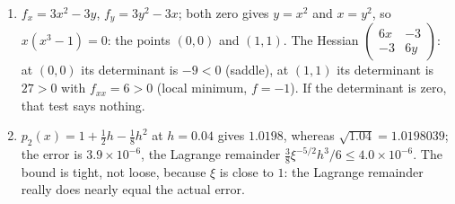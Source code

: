 \begin{enumerate}[label=\textbf{12.\arabic*}]
  \item $f_{x}=3x^{2}-3y$, $f_{y}=3y^{2}-3x$; both zero gives $y=x^{2}$ and
        $x=y^{2}$, so $x(x^{3}-1)=0$: the points $(0,0)$ and $(1,1)$. The Hessian
        $\begin{pmatrix}6x&-3\\-3&6y\end{pmatrix}$: at $(0,0)$ its determinant is
        $-9<0$ (saddle), at $(1,1)$ its determinant is $27>0$ with $f_{xx}=6>0$
        (local minimum, $f=-1$). If the determinant is zero, that test says nothing.

  \item $p_{2}(x)=1+\tfrac12h-\tfrac18h^{2}$ at $h=0.04$ gives $1.0198$,
        whereas $\sqrt{1.04}=1.0198039$; the error is
        $3.9\times10^{-6}$, the Lagrange remainder
        $\frac{3}{8}\xi^{-5/2}h^{3}/6\le4.0\times10^{-6}$. The bound is tight, not loose, because $\xi$ is close
        to $1$: the Lagrange remainder really does nearly equal the actual error.
\end{enumerate}

